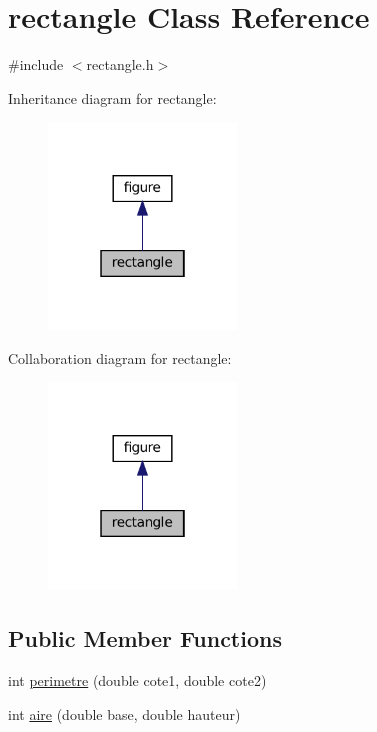\hypertarget{classrectangle}{}\section{rectangle Class Reference}
\label{classrectangle}


{\ttfamily \#include $<$rectangle.\+h$>$}



Inheritance diagram for rectangle\+:
\nopagebreak
\begin{figure}[H]
\begin{center}
\leavevmode
\includegraphics[width=142pt]{classrectangle__inherit__graph}
\end{center}
\end{figure}


Collaboration diagram for rectangle\+:
\nopagebreak
\begin{figure}[H]
\begin{center}
\leavevmode
\includegraphics[width=142pt]{classrectangle__coll__graph}
\end{center}
\end{figure}
\subsection*{Public Member Functions}
\begin{DoxyCompactItemize}
\item 
int \hyperlink{classrectangle_a6de6e798ba0de4ca940ec2089a3bd774}{perimetre} (double cote1, double cote2)
\item 
int \hyperlink{classrectangle_ac96948e7667ebe186603b671d373f449}{aire} (double base, double hauteur)
\end{DoxyCompactItemize}


